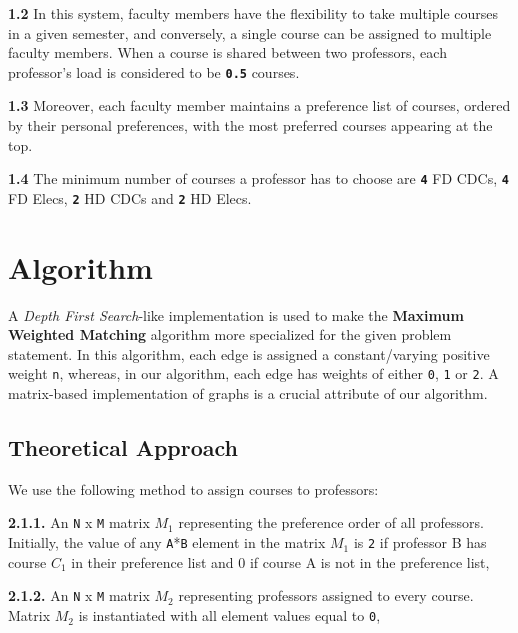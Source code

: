 \documentclass{article}
\begin{document}
        \textbf{1.2} In this system, faculty members have the flexibility to take multiple courses in a given semester, and conversely, a single course can be assigned to multiple faculty members. When a course is shared between two professors, each professor's load is considered to be \texttt{\textbf{0.5}} courses.

        \bigskip
        
        \textbf{1.3} Moreover, each faculty member maintains a preference list of courses, ordered by their personal preferences, with the most preferred courses appearing at the top.

        \bigskip
        
        \textbf{1.4} The minimum number of courses a professor has to choose are \texttt{\textbf{4}} FD CDCs, \texttt{\textbf{4}} FD Elecs, \texttt{\textbf{2}} HD CDCs and \texttt{\textbf{2}} HD Elecs.

\section{Algorithm}

A \textit{Depth First Search}-like implementation is used to make the \textbf{Maximum Weighted Matching} algorithm more specialized for the given problem statement. In this algorithm, each edge is assigned a constant/varying positive weight \texttt{n}, whereas, in our algorithm, each edge has weights of either \texttt{0}, \texttt{1} or \texttt{2}. A matrix-based implementation of graphs is a crucial attribute of our algorithm.

\subsection{Theoretical Approach}
We use the following method to assign courses to professors:
\bigskip
    
    \textbf{2.1.1.} An \texttt{N} x \texttt{M} matrix \textbf{{\texttt{$M_1$}}} representing the preference order of all professors. Initially, the value of any \texttt{A}*\texttt{B} element in the matrix \texttt{\textbf{$M_1$}} is \texttt{2} if professor B has course \texttt{\textbf{$C_1$}} in their preference list and 0 if course A is not in the preference list,

    \bigskip
    
    \textbf{2.1.2.} An \texttt{N} x \texttt{M} matrix \texttt{\textbf{$M_2$}} representing professors assigned to every course. Matrix \texttt{\textbf{$M_2$}} is instantiated with all element values equal to \texttt{0},
\end{document}
